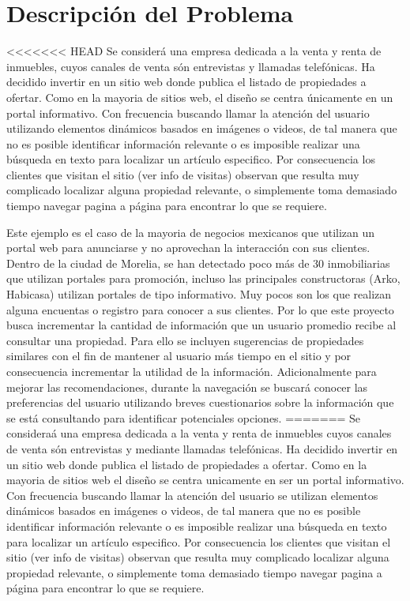 \section{Descripción del Problema}\label{descripciuxf3n-del-problema}

<<<<<<< HEAD
Se considerá una empresa dedicada a la venta y renta de inmuebles, cuyos canales  de venta són  entrevistas y  llamadas telefónicas. Ha decidido invertir en un sitio web donde publica el listado de propiedades a ofertar. Como en la mayoria de sitios web, el diseño se centra únicamente en un portal informativo. Con frecuencia buscando llamar la atención del usuario utilizando elementos dinámicos basados en imágenes o videos,  de tal manera que no es posible identificar información relevante o es imposible realizar una búsqueda en texto para localizar un artículo especifico. Por consecuencia los clientes que visitan el sitio (ver info de visitas) observan que resulta muy complicado localizar alguna propiedad relevante, o simplemente toma demasiado tiempo navegar pagina a página para encontrar lo que se requiere. 

Este ejemplo es el caso de la mayoria de negocios mexicanos que utilizan un portal web para anunciarse y no aprovechan la interacción con sus clientes.
Dentro de la ciudad de Morelia, se han detectado poco más de 30 inmobiliarias que utilizan portales para promoción, incluso las principales constructoras (Arko, Habicasa) utilizan  portales de tipo informativo. Muy pocos son los que realizan alguna encuentas o registro para conocer a sus clientes. Por lo que este proyecto busca incrementar la cantidad de información que un usuario promedio recibe al consultar una propiedad. Para ello se incluyen sugerencias de propiedades similares con el fin de mantener al usuario más tiempo en el sitio y por consecuencia incrementar la utilidad de la información. Adicionalmente para mejorar las recomendaciones, durante la navegación se buscará conocer las preferencias del usuario utilizando  breves cuestionarios sobre la información que se está consultando para identificar potenciales opciones. 
=======
Se consideraá una empresa dedicada a la venta y renta de inmuebles cuyos canales  de venta són  entrevistas y mediante llamadas telefónicas. Ha decidido invertir en un sitio web donde publica el listado de propiedades a ofertar. Como en la mayoria de sitios web el diseño se centra unicamente en ser un portal informativo. Con frecuencia buscando llamar la atención del usuario se utilizan elementos dinámicos basados en imágenes o videos,  de tal manera que no es posible identificar información relevante o es imposible realizar una búsqueda en texto para localizar un artículo especifico. Por consecuencia los clientes que visitan el sitio (ver info de visitas) observan que resulta muy complicado localizar alguna propiedad relevante, o simplemente toma demasiado tiempo navegar pagina a página para encontrar lo que se requiere. 

